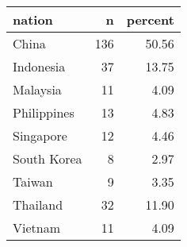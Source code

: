 \begin{tabular}{lrr}
  \hline
nation & n & percent \\ 
  \hline
China & 136 & 50.56 \\ 
  Indonesia &  37 & 13.75 \\ 
  Malaysia &  11 & 4.09 \\ 
  Philippines &  13 & 4.83 \\ 
  Singapore &  12 & 4.46 \\ 
  South Korea &   8 & 2.97 \\ 
  Taiwan &   9 & 3.35 \\ 
  Thailand &  32 & 11.90 \\ 
  Vietnam &  11 & 4.09 \\ 
   \hline
\end{tabular}
